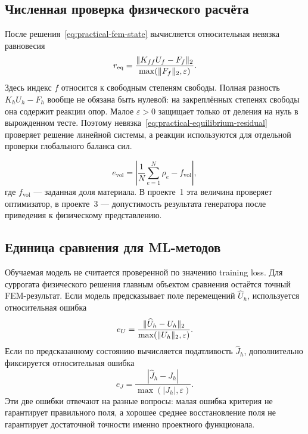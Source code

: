 \subsection{Численная проверка физического расчёта}

После решения~\eqref{eq:practical-fem-state} вычисляется относительная невязка равновесия
\begin{equation}
\label{eq:practical-equilibrium-residual}
 r_{\mathrm{eq}}
 =
 \frac{
 \lVert K_{ff}U_f-F_f\rVert_2
 }{
 \max(\lVert F_f\rVert_2,\varepsilon)
 }.
\end{equation}
Здесь индекс $f$ относится к свободным степеням свободы. Полная разность $K_hU_h-F_h$ вообще не обязана быть нулевой: на закреплённых степенях свободы она содержит реакции опор. Малое $\varepsilon>0$ защищает только от деления на нуль в вырожденном тесте. Поэтому невязка~\eqref{eq:practical-equilibrium-residual} проверяет решение линейной системы, а реакции используются для отдельной проверки глобального баланса сил.

\begin{equation}
\label{eq:practical-volume-error}
 e_{\mathrm{vol}}
 =
 \left|
 \frac{1}{N}\sum_{e=1}^{N}\rho_e
 -
 f_{\mathrm{vol}}
 \right|,
\end{equation}
где $f_{\mathrm{vol}}$ --- заданная доля материала. В проекте~1 эта величина проверяет оптимизатор, в проекте~3 --- допустимость результата генератора после приведения к физическому представлению.

\subsection{Единица сравнения для ML-методов}

Обучаемая модель не считается проверенной по значению training loss. Для суррогата физического решения главным объектом сравнения остаётся точный FEM-результат. Если модель предсказывает поле перемещений $\widehat U_h$, используется относительная ошибка
\begin{equation}
\label{eq:practical-field-error}
 e_U
 =
 \frac{\lVert\widehat U_h-U_h\rVert_2}
 {\max(\lVert U_h\rVert_2,\varepsilon)}.
\end{equation}
Если по предсказанному состоянию вычисляется податливость $\widehat J_h$, дополнительно фиксируется относительная ошибка
\begin{equation}
\label{eq:practical-compliance-error}
 e_J
 =
 \frac{|\widehat J_h-J_h|}
 {\max(|J_h|,\varepsilon)}.
\end{equation}
Эти две ошибки отвечают на разные вопросы: малая ошибка критерия не гарантирует правильного поля, а хорошее среднее восстановление поля не гарантирует достаточной точности именно проектного функционала.

